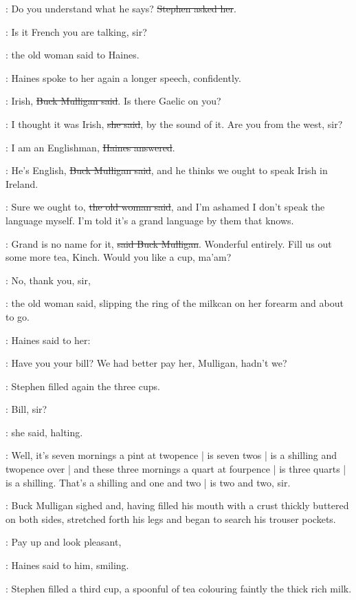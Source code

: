 \Stephen:
Do you understand what he says?
\sout{Stephen asked her}.

\OldWoman:
Is it French you are talking, sir?

:
the old woman said to Haines.

:
Haines spoke to her again a longer speech, confidently.

\Mulligan:
Irish,
\sout{Buck Mulligan said}.
Is there Gaelic on you?

\OldWoman:
I thought it was Irish,
\sout{she said},
by the sound of it.
Are you from the west, sir?

\Haines:
I am an Englishman,
\sout{Haines answered}.

\Mulligan:
He's English,
\sout{Buck Mulligan said},
and he thinks we ought to speak Irish in Ireland.

\OldWoman:
Sure we ought to,
\sout{the old woman said},
and I'm ashamed I don't speak the language myself.
I'm told it's a grand language by them that knows.

\Mulligan:
Grand is no name for it,
\sout{said Buck Mulligan}.
Wonderful entirely.
Fill us out some more tea, Kinch.
Would you like a cup, ma'am?

\OldWoman:
No, thank you, sir,

:
the old woman said,
slipping the ring of the milkcan on her forearm
and about to go.

:
Haines said to her:

\Haines:
Have you your bill?
We had better pay her, Mulligan, hadn't we?

:
Stephen filled again the three cups.

\OldWoman:
Bill, sir?

:
she said, halting.

\OldWoman:
Well, it's seven mornings a pint at twopence |
is seven twos |
is a shilling and twopence over |
and these three mornings a quart at fourpence |
is three quarts |
is a shilling.
That's a shilling and one and two |
is two and two, sir.

:
Buck Mulligan sighed
and, having filled his mouth with a crust thickly buttered on both sides,
stretched forth his legs and began to search his trouser pockets.

\Haines:
Pay up and look pleasant,

:
Haines said to him, smiling.

:
Stephen filled a third cup,
a spoonful of tea colouring faintly the thick rich milk.

